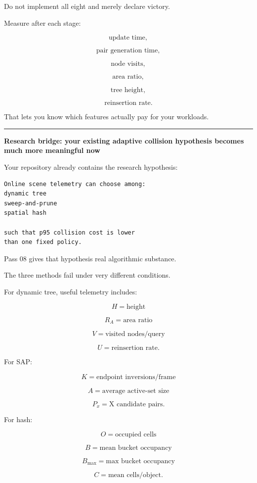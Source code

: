 Do not implement all eight and merely declare victory.

Measure after each stage:

\[
\text{update time},
\]

\[
\text{pair generation time},
\]

\[
\text{node visits},
\]

\[
\text{area ratio},
\]

\[
\text{tree height},
\]

\[
\text{reinsertion rate}.
\]

That lets you know which features actually pay for your workloads.

\begin{center}\rule{0.5\linewidth}{0.5pt}\end{center}

\textbf{Research bridge: your existing adaptive collision hypothesis becomes much more meaningful now}

Your repository already contains the research hypothesis:

\begin{verbatim}
Online scene telemetry can choose among:
dynamic tree
sweep-and-prune
spatial hash

such that p95 collision cost is lower
than one fixed policy.
\end{verbatim}

Pass 08 gives that hypothesis real algorithmic substance.

The three methods fail under very different conditions.

For dynamic tree, useful telemetry includes:

\[
H=\text{height}
\]

\[
R_A=\text{area ratio}
\]

\[
V=\text{visited nodes/query}
\]

\[
U=\text{reinsertion rate}.
\]

For SAP:

\[
K=\text{endpoint inversions/frame}
\]

\[
A=\text{average active-set size}
\]

\[
P_x=\text{X candidate pairs}.
\]

For hash:

\[
O=\text{occupied cells}
\]

\[
B=\text{mean bucket occupancy}
\]

\[
B_{\max}=\text{max bucket occupancy}
\]

\[
C=\text{mean cells/object}.
\]

